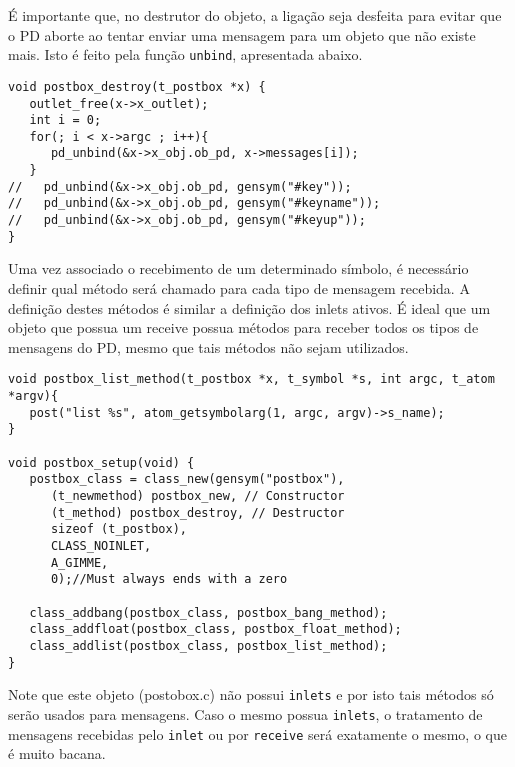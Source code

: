 É importante que, no destrutor do objeto, a ligação seja desfeita para evitar
que o PD aborte ao tentar enviar uma mensagem para um objeto que não existe mais.
Isto é feito pela função \texttt{unbind}, apresentada abaixo.

\begin{lstlisting}[caption=Desvinculando o objeto com a mensagem no destrutor]
void postbox_destroy(t_postbox *x) {
   outlet_free(x->x_outlet);
   int i = 0;
   for(; i < x->argc ; i++){
      pd_unbind(&x->x_obj.ob_pd, x->messages[i]);
   }
//   pd_unbind(&x->x_obj.ob_pd, gensym("#key"));
//   pd_unbind(&x->x_obj.ob_pd, gensym("#keyname"));
//   pd_unbind(&x->x_obj.ob_pd, gensym("#keyup"));
}
\end{lstlisting}


Uma vez associado o recebimento de um determinado símbolo, é necessário definir
qual método será chamado para cada tipo de mensagem recebida.
A definição destes métodos é similar a definição dos inlets ativos.
É ideal que um objeto que possua um receive possua métodos para receber todos
os tipos de mensagens do PD, mesmo que tais métodos não sejam utilizados.

\begin{lstlisting}[caption=Associando métodos para receber mensagens]
void postbox_list_method(t_postbox *x, t_symbol *s, int argc, t_atom *argv){
   post("list %s", atom_getsymbolarg(1, argc, argv)->s_name);
}

void postbox_setup(void) {
   postbox_class = class_new(gensym("postbox"),
      (t_newmethod) postbox_new, // Constructor
      (t_method) postbox_destroy, // Destructor
      sizeof (t_postbox),
      CLASS_NOINLET,
      A_GIMME,
      0);//Must always ends with a zero

   class_addbang(postbox_class, postbox_bang_method);
   class_addfloat(postbox_class, postbox_float_method);
   class_addlist(postbox_class, postbox_list_method);
}
\end{lstlisting}

Note que este objeto (postobox.c) não possui \texttt{inlets} e por isto tais métodos
só serão usados para mensagens.
Caso o mesmo possua \texttt{inlets}, o tratamento de mensagens recebidas pelo \texttt{inlet} ou
por \texttt{receive} será exatamente o mesmo, o que é muito bacana.


